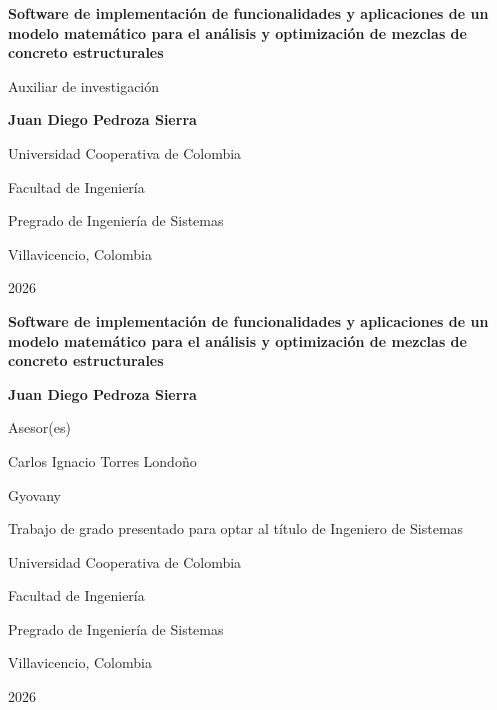 \documentclass[12pt, letterpaper]{article}
\begin{document}
\begin{titlepage}
    \centering
    \vspace*{0.5cm}
    {\large \bfseries Software de implementación de funcionalidades y aplicaciones de un modelo
    matemático para el análisis y optimización de mezclas de concreto estructurales\par}
    \vspace{1.5cm}
    \vspace{1.5cm}
    {\large Auxiliar de investigación\par}
    \vspace{1.5cm}
    {\large \bfseries Juan Diego Pedroza Sierra\par}
    \vspace{3cm}
    {\normalsize Universidad Cooperativa de Colombia\par}
    {\normalsize Facultad de Ingeniería\par}
    {\normalsize Pregrado de Ingeniería de Sistemas\par}
    {\normalsize Villavicencio, Colombia\par}
    {\normalsize 2026\par}
\end{titlepage}

\newpage
\thispagestyle{empty}
\begin{center}
    \vspace*{0.5cm}
    {\large \bfseries Software de implementación de funcionalidades y aplicaciones de un modelo
    matemático para el análisis y optimización de mezclas de concreto estructurales\par}
    \vspace{2cm}
    {\large \bfseries Juan Diego Pedroza Sierra\par}
    \vspace{2cm}
    {\normalsize Asesor(es)\par}
    {\normalsize Carlos Ignacio Torres Londoño\par}
    {\normalsize Gyovany\par}
    \vspace{2cm}
    {\normalsize Trabajo de grado presentado para optar al título de Ingeniero de Sistemas\par}
    \vspace{3cm}
    {\normalsize Universidad Cooperativa de Colombia\par}
    {\normalsize Facultad de Ingeniería\par}
    {\normalsize Pregrado de Ingeniería de Sistemas\par}
    {\normalsize Villavicencio, Colombia\par}
    {\normalsize 2026\par}
\end{center}
\end{document}
